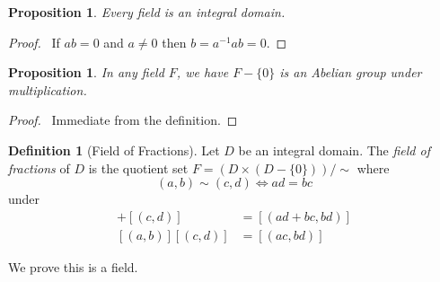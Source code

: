 \documentclass{book}
\let\qed\relax
\newtheorem{prop}[ax]{Proposition}
\theoremstyle{definition}
\newtheorem{df}[ax]{Definition}
\begin{document}
\begin{prop}
Every field is an integral domain.
\end{prop}

\begin{proof}
\pf\ If $ab = 0$ and $a \neq 0$ then $b = a^{-1}ab = 0$. \qed
\end{proof}

\begin{prop}
In any field $F$, we have $F - \{0\}$ is an Abelian group under multiplication.
\end{prop}

\begin{proof}
\pf\ Immediate from the definition. \qed
\end{proof}

\begin{df}[Field of Fractions]
Let $D$ be an integral domain. The \emph{field of fractions} of $D$ is the quotient set $F = (D \times (D - \{0\})) / \sim$ where
\[ (a,b) \sim (c,d) \Leftrightarrow ad = bc \]
under
\begin{align*}
[(a,b)] + [(c,d)] & = [(ad+bc,bd)] \\
[(a,b)][(c,d)] & = [(ac,bd)]
\end{align*}

We prove this is a field.
\end{df}
\end{document}
